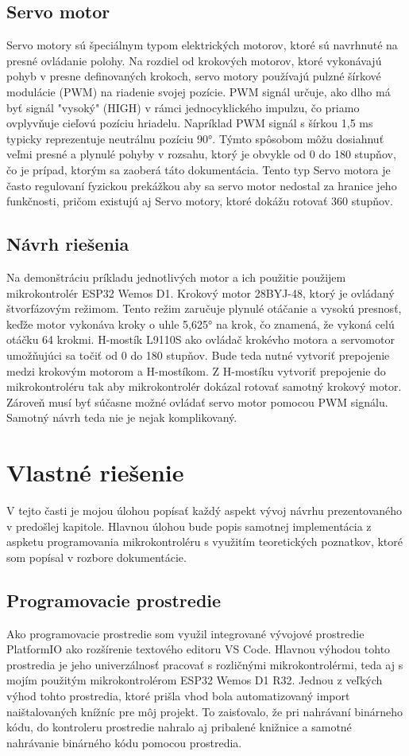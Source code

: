 \documentclass[a4paper, 11pt]{article}
\begin{document}
\subsection{Servo motor}
Servo motory sú špeciálnym typom elektrických motorov, ktoré sú navrhnuté na presné ovládanie polohy. Na rozdiel od krokových motorov, ktoré vykonávajú pohyb v presne definovaných krokoch, servo motory používajú pulzné šírkové modulácie (PWM) na riadenie svojej pozície. PWM signál určuje, ako dlho má byť signál "vysoký" (HIGH) v rámci jednocyklického impulzu, čo priamo ovplyvňuje cieľovú pozíciu hriadelu. Napríklad PWM signál s šírkou 1,5 ms typicky reprezentuje neutrálnu pozíciu 90°. Týmto spôsobom môžu dosiahnuť veľmi presné a plynulé pohyby v rozsahu, ktorý je obvykle od 0 do 180 stupňov, čo je prípad, ktorým sa zaoberá táto dokumentácia. Tento typ Servo motora je často regulovaní fyzickou prekážkou aby sa servo motor nedostal za hranice jeho funkčnosti, pričom existujú aj Servo motory, ktoré dokážu rotovať 360 stupňov.

\subsection{Návrh riešenia}
Na demonštráciu príkladu jednotlivých motor a ich použitie použijem mikrokontrolér ESP32 Wemos D1. Krokový motor  28BYJ-48, ktorý je ovládaný štvorfázovým režimom. Tento režim zaručuje plynulé otáčanie a vysokú presnosť, keďže motor vykonáva kroky o uhle 5,625° na krok, čo znamená, že vykoná celú otáčku 64 krokmi. H-mostík L9110S ako ovládač krokévho motora a servomotor umožňujúci sa točiť od 0 do 180 stupňov. 
Bude teda nutné vytvoriť prepojenie medzi krokovým motorom a H-mostíkom. Z H-mostíku vytvoriť prepojenie do mikrokontroléru tak aby mikrokontrolér dokázal rotovať samotný krokový motor. Zároveň musí byť súčasne možné ovládať servo motor pomocou PWM signálu. Samotný návrh teda nie je nejak komplikovaný.

\clearpage
\section{Vlastné riešenie}
V tejto časti je mojou úlohou popísať každý aspekt vývoj návrhu prezentovaného v predošlej kapitole. Hlavnou úlohou bude popis samotnej implementácia z aspketu programovania mikrokontroléru s využitím teoretických poznatkov, ktoré som popísal v rozbore dokumentácie. 
\subsection{Programovacie prostredie}
Ako programovacie prostredie som využil integrované vývojové prostredie PlatformIO ako rozšírenie textového editoru VS Code. Hlavnou výhodou tohto prostredia je jeho univerzálnosť pracovať s rozličnými mikrokontrolérmi, teda aj s mojím použitým mikrokontrolérom ESP32 Wemos D1 R32. Jednou z veľkých výhod tohto prostredia, ktoré prišla vhod bola automatizovaný import naištalovaných knížníc pre môj projekt. To zaisťovalo, že pri nahrávaní binárneho kódu, do kontroleru prostredie nahralo aj pribalené knižnice a samotné nahrávanie binárného kódu pomocou prostredia. 
\end{document}
